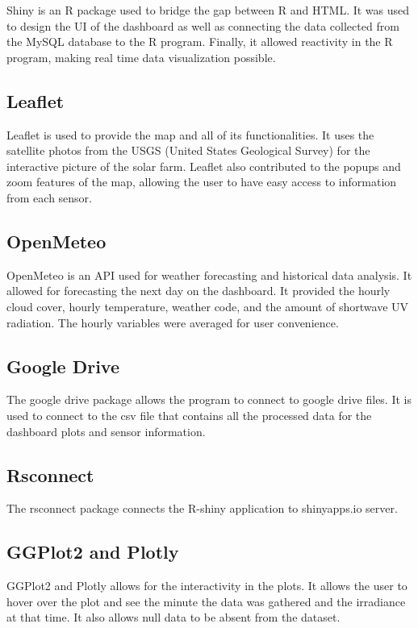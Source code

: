 \documentclass{sigchi}
\begin{document}
Shiny is an R package used to bridge the gap between R and HTML. It was used to design the UI of the dashboard as well as connecting the data collected from the MySQL database to the R program. Finally, it allowed reactivity in the R program, making real time data visualization possible.\cite{R-Shiny}\cite{Wickham_2021}

\subsection{Leaflet}

Leaflet is used to provide the map and all of its functionalities. It uses the satellite photos from the USGS (United States Geological Survey) for the interactive picture of the solar farm. Leaflet also contributed to the popups and zoom features of the map, allowing the user to have easy access to information from each sensor.\cite{Leaflet}

\subsection{OpenMeteo}

OpenMeteo is an API used for weather forecasting and historical data analysis. It allowed for forecasting the next day on the dashboard. It provided the hourly cloud cover, hourly temperature, weather code, and the amount of shortwave UV radiation. The hourly variables were averaged for user convenience.\cite{OpenMeteo}

\subsection{Google Drive}
The google drive package allows the program to connect to google drive files. It is used to connect to the csv file that contains all the processed data for the dashboard plots and sensor information.\cite{GD}

\subsection{Rsconnect}
The rsconnect package connects the R-shiny application to shinyapps.io server. \cite{RSConnect}

\subsection{GGPlot2 and Plotly}
GGPlot2 and Plotly allows for the interactivity in the plots. It allows the user to hover over the plot and see the minute the data was gathered and the irradiance at that time. It also allows null data to be absent from the dataset. 
\end{document}
